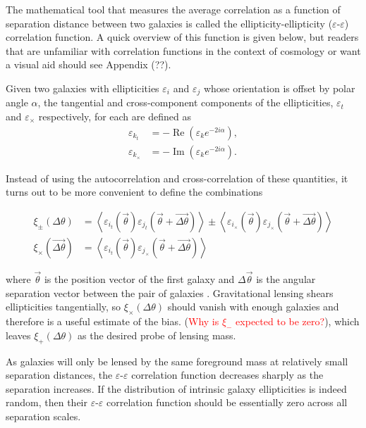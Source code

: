 \documentclass[%
 reprint,
 amsmath,amssymb,
 aps,nofootinbib
]{revtex4-1}
\begin{document}
The mathematical tool that measures the average correlation as a function of separation distance between two galaxies is called the ellipticity-ellipticity ($\varepsilon$-$\varepsilon$) correlation function. A quick overview of this function is given below, but readers that are unfamiliar with correlation functions in the context of cosmology or want a visual aid should see Appendix (??).

Given two galaxies with ellipticities $\varepsilon_i$ and $\varepsilon_j$ whose orientation is offset by polar angle $\alpha$, the tangential and cross-component components of the ellipticities, $\varepsilon_t$ and $\varepsilon_\times$ respectively, for each are defined as
\begin{align}
\varepsilon_{k_t}&=-\operatorname{Re}\left(\varepsilon_k e^{-2i\alpha}\right),\\
\varepsilon_{k_\times}&=-\operatorname{Im}\left(\varepsilon_k e^{-2i\alpha}\right).
\end{align}

\noindent Instead of using the autocorrelation and cross-correlation of these quantities, it turns out to be more convenient to define the combinations

\begin{align}\label{gg_corr_def}
\xi_\pm(\Delta\theta)&=\left<\varepsilon_{i_t}(\vec{\theta})\varepsilon_{j_t}(\vec{\theta}+\vec{\Delta\theta})\right>\pm\left<\varepsilon_{i_\times}(\vec{\theta})\varepsilon_{j_\times}(\vec{\theta}+\vec{\Delta\theta})\right>\\
\xi_\times(\vec{\Delta\theta})&=\left<\varepsilon_{i_t}(\vec{\theta})\varepsilon_{j_\times}(\vec{\theta}+\vec{\Delta\theta})\right>
\end{align}

\noindent where $\vec{\theta}$ is the position vector of the first galaxy and $\Delta\vec{\theta}$ is the angular separation vector between the pair of galaxies \cite{schneider}. Gravitational lensing shears ellipticities tangentially, so $\xi_\times(\Delta\theta)$ should vanish with enough galaxies and therefore is a useful estimate of the bias. (\textcolor{red}{Why is $\xi_-$ expected to be zero?}), which leaves $\xi_+(\Delta\theta)$ as the desired probe of lensing mass.

As galaxies will only be lensed by the same foreground mass at relatively small separation distances, the $\varepsilon$-$\varepsilon$ correlation function decreases sharply as the separation increases. If the distribution of intrinsic galaxy ellipticities is indeed random, then their $\varepsilon$-$\varepsilon$ correlation function should be essentially zero across all separation scales. 
\end{document}
